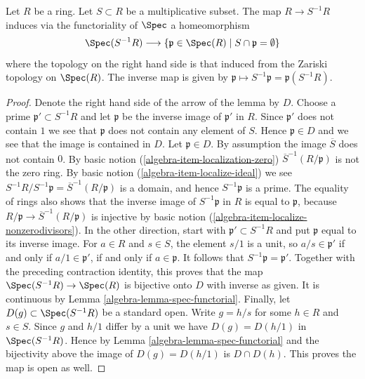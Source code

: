 \begin{lemma}
\label{editorial-source-lemma-spec-localization}
Let $R$ be a ring. Let $S \subset R$ be a multiplicative subset.
The map $R \to S^{-1}R$ induces via the functoriality of $\Spec$
a homeomorphism
$$
\Spec(S^{-1}R)
\longrightarrow
\{\mathfrak p \in \Spec(R) \mid S \cap \mathfrak p = \emptyset \}
$$
where the topology on the right hand side is that induced from the
Zariski topology on $\Spec(R)$. The inverse map is given
by $\mathfrak p \mapsto S^{-1}\mathfrak p = \mathfrak p(S^{-1}R)$.
\end{lemma}

\begin{proof}
Denote the right hand side of the arrow of the lemma by $D$.
Choose a prime $\mathfrak p' \subset S^{-1}R$ and let $\mathfrak p$ be
the inverse image of $\mathfrak p'$ in $R$. Since $\mathfrak p'$
does not contain $1$ we see that $\mathfrak p$ does not contain
any element of $S$. Hence $\mathfrak p \in D$ and we see that
the image is contained in $D$. Let $\mathfrak p \in D$.
By assumption the image $\overline{S}$ does not contain $0$.
By basic notion (\ref{algebra-item-localization-zero})
$\overline{S}^{-1}(R/\mathfrak p)$ is not the zero ring.
By basic notion (\ref{algebra-item-localize-ideal}) we see
$S^{-1}R / S^{-1}\mathfrak p = \overline{S}^{-1}(R/\mathfrak p)$
is a domain, and hence $S^{-1}\mathfrak p$ is a prime.
The equality of rings also shows that the inverse image of
$S^{-1}\mathfrak p$ in $R$ is equal to $\mathfrak p$,
because $R/\mathfrak p \to \overline{S}^{-1}(R/\mathfrak p)$
is injective by basic notion (\ref{algebra-item-localize-nonzerodivisors}).
In the other direction, start with $\mathfrak p'\subset S^{-1}R$
and put $\mathfrak p$ equal to its inverse image.
For $a\in R$ and $s\in S$, the element $s/1$ is a unit, so
$a/s\in\mathfrak p'$ if and only if $a/1\in\mathfrak p'$,
if and only if $a\in\mathfrak p$.
It follows that $S^{-1}\mathfrak p=\mathfrak p'$.
Together with the preceding contraction identity, this proves that
the map $\Spec(S^{-1}R) \to \Spec(R)$
is bijective onto $D$ with inverse as given.
It is continuous by Lemma \ref{algebra-lemma-spec-functorial}.
Finally, let $D(g) \subset \Spec(S^{-1}R)$ be a standard
open. Write $g = h/s$ for some $h\in R$ and $s\in S$.
Since $g$ and $h/1$ differ by a unit we have $D(g) =
D(h/1)$ in $\Spec(S^{-1}R)$.
Hence by Lemma \ref{algebra-lemma-spec-functorial} and the bijectivity
above the image of $D(g) = D(h/1)$ is $D \cap D(h)$.
This proves the map is open as well.
\end{proof}



